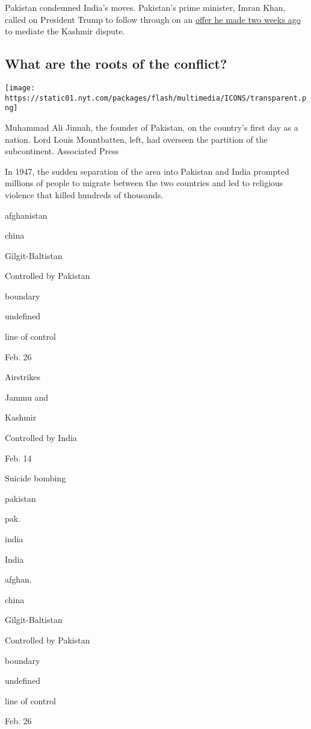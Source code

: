 Pakistan condemned India's moves. Pakistan's prime minister, Imran Khan,
called on President Trump to follow through on an
\href{https://www.nytimes.com/2019/07/22/world/asia/trump-pakistan-afghanistan.html}{offer
he made two weeks ago} to mediate the Kashmir dispute.

\hypertarget{what-are-the-roots-of-the-conflict}{%
\subsection{What are the roots of the
conflict?}\label{what-are-the-roots-of-the-conflict}}

\texttt{[image: https://static01.nyt.com/packages/flash/multimedia/ICONS/transparent.png]}

Muhammad Ali Jinnah, the founder of Pakistan, on the country's first day
as a nation. Lord Louis Mountbatten, left, had overseen the partition of
the subcontinent. Associated Press

In 1947, the sudden separation of the area into Pakistan and India
prompted millions of people to migrate between the two countries and led
to religious violence that killed hundreds of thousands.

afghanistan

china

Gilgit-Baltistan

Controlled by Pakistan

boundary

undefined

line of control

Feb. 26

Airstrikes

Jammu and

Kashmir

Controlled by India

Feb. 14

Suicide bombing

pakistan

pak.

india

India

afghan.

china

Gilgit-Baltistan

Controlled by Pakistan

boundary

undefined

line of control

Feb. 26

